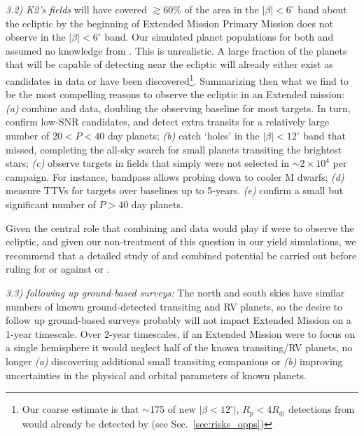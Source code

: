 \textit{3.2) K2's fields} will have covered $\gtrsim\!60\%$ of the area in the $|\beta|<6^\circ$ band about the ecliptic by the beginning of \tesss Extended Mission %
\tesss Primary Mission does not observe in the $|\beta|<6^\circ$ band. 
Our simulated planet populations for both \elong\:and \eshort\:assumed no knowledge from \ktwo\!.
This is unrealistic.
A large fraction of the planets that \tess will be capable of detecting near the ecliptic will already either exist as candidates in \ktwos data or have been discovered\footnote{Our coarse estimate is that $\sim$175 of  new $|\beta<12^\circ|$, $R_p<4R_\oplus$ detections from \elong\:would already be detected by \ktwo (see Sec.~\protect\ref{sec:risks_opps})}.
Summarizing then what we find to be the most compelling reasons to observe the ecliptic in an Extended \tess mission:
\textit{(a)} combine \tess and \ktwo data, doubling the \ktwo observing baseline for most targets. In turn, confirm low-SNR candidates, and detect extra transits for a relatively large number of $20<P<40$ day planets;
\textit{(b)} catch `holes' in the $|\beta| < 12^\circ$ band that \ktwo missed, completing the all-sky search for small planets transiting the brightest stars;
\textit{(c)} observe targets in \ktwo fields that simply were not selected in \ktwos $\sim\!2\times10^4$ per campaign. For instance, \tesss bandpass allows probing down to cooler M dwarfs;
\textit{(d)} measure TTVs for targets over baselines up to 5-years.
\textit{(e)} confirm a small but significant number of $P>40$ day planets.

Given the central role that combining \tess and \ktwo data would play if \tess were to observe the ecliptic, and given our non-treatment of this question in our yield simulations, we recommend that a detailed study of \ktwo and \tesss combined potential be carried out before ruling for or against \elong\:or \eshort.

\textit{3.3) \tess following up ground-based surveys:}
The north and south skies have similar numbers of known ground-detected transiting and RV planets, so the desire to follow up ground-based surveys probably will not impact \tesss Extended Mission on a 1-year timescale.
Over 2-year timescales, if an Extended Mission were to focus on a single hemisphere it would neglect half of the known transiting/RV planets, no longer \textit{(a)} discovering additional small transiting companions %
or \textit{(b)} improving uncertainties in the physical and orbital parameters of known planets.



